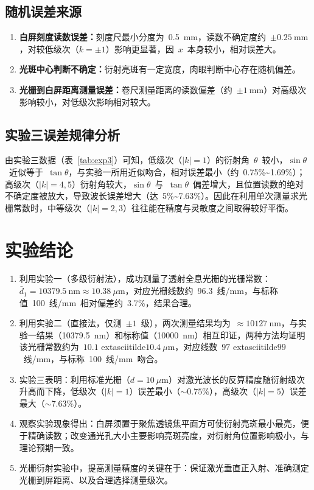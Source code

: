 \documentclass[12pt, a4paper]{article}
\begin{document}
\subsection{随机误差来源}

\begin{enumerate}
  \item \textbf{白屏刻度读数误差：}刻度尺最小分度为~0.5~mm，读数不确定度约~$\pm0.25~\text{mm}$，对较低级次（$k = \pm1$）影响更显著，因~$x$~本身较小，相对误差大。
  \item \textbf{光斑中心判断不确定：}衍射亮斑有一定宽度，肉眼判断中心存在随机偏差。
  \item \textbf{光栅到白屏距离测量误差：}卷尺测量距离的读数偏差（约~$\pm1~\text{mm}$）对高级次影响较小，对低级次影响相对较大。
\end{enumerate}

\subsection{实验三误差规律分析}

由实验三数据（表~\ref{tab:exp3}）可知，低级次（$|k| = 1$）的衍射角~$\theta$~较小，$\sin\theta$~近似等于~$\tan\theta$，与实验一所用近似吻合，相对误差最小（约~0.75\%\textasciitilde1.69\%）；高级次（$|k| = 4, 5$）衍射角较大，$\sin\theta$~与~$\tan\theta$~偏差增大，且位置读数的绝对不确定度被放大，导致波长误差增大（达~5\%\textasciitilde7.63\%）。因此在利用单次测量求光栅常数时，中等级次（$|k| = 2, 3$）往往能在精度与灵敏度之间取得较好平衡。

\section{实验结论}

\begin{enumerate}
  \item 利用实验一（多级衍射法），成功测量了透射全息光栅的光栅常数：$\bar{d}_1 = 10379.5~\text{nm} \approx 10.38~\mu\text{m}$，对应光栅线数约~96.3~线/mm，与标称值~100~线/mm~相对偏差约~3.7\%，结果合理。
  \item 利用实验二（直接法，仅测~$\pm1$~级），两次测量结果均为~$\approx10127~\text{nm}$，与实验一结果（10379.5~nm）和标称值（10000~nm）相互印证，两种方法均证明该光栅常数约为~$10.1$	extasciitilde$10.4~\mu\text{m}$，对应线数~$97$	extasciitilde$99$~线/mm，与标称~100~线/mm~吻合。
  \item 实验三表明：利用标准光栅（$d = 10~\mu\text{m}$）对激光波长的反算精度随衍射级次升高而下降，低级次（$|k|=1$）误差最小（$\sim0.75\%$），高级次（$|k|=5$）误差最大（$\sim7.63\%$）。
  \item 观察实验现象得出：白屏须置于聚焦透镜焦平面方可使衍射亮斑最小最亮，便于精确读数；改变通光孔大小主要影响亮斑亮度，对衍射角位置影响极小，与理论预期一致。
  \item 光栅衍射实验中，提高测量精度的关键在于：保证激光垂直正入射、准确测定光栅到屏距离、以及合理选择测量级次。
\end{enumerate}
\end{document}
